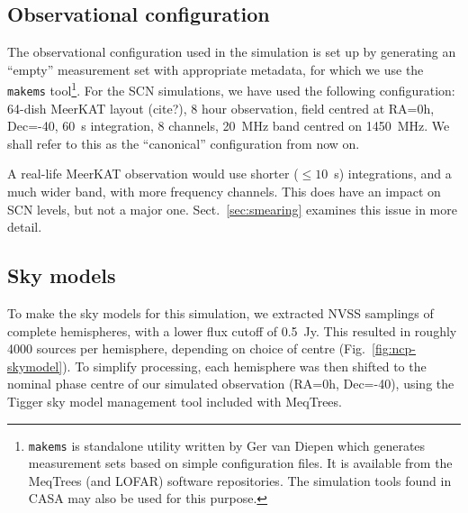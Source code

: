 \documentclass{aa}
\begin{document}
\subsection{Observational configuration}
\label{sec:config}

The observational configuration used in the simulation is set up by generating an ``empty'' measurement set with appropriate metadata, for which we use the {\tt makems} tool\footnote{{\tt makems} is standalone utility written by Ger van Diepen which generates measurement sets based on simple configuration files. It is available from the MeqTrees (and LOFAR) software repositories. The simulation tools found in CASA may also be used for this purpose.}. For the SCN simulations, we have used the following configuration: 64-dish MeerKAT layout (cite?), 8 hour observation, field centred at RA=0h, Dec=-40\degr, 60~s integration, 8 channels, 20~MHz band centred on 1450~MHz. We shall refer to this as the ``canonical'' configuration from now on.

A real-life MeerKAT observation would use shorter ($\leq10$~s) integrations, and a much wider band, with more frequency channels. This does have an impact on SCN levels, but not a major one. Sect.~\ref{sec:smearing} examines this issue in more detail.

\subsection{Sky models}

To make the sky models for this simulation, we extracted NVSS samplings of complete hemispheres, with a lower flux cutoff of 0.5~Jy. This resulted in roughly 4000 sources per hemisphere, depending on choice of centre (Fig.~\ref{fig:ncp-skymodel}). To simplify processing, each hemisphere was then shifted to the nominal phase centre of our simulated observation (RA=0h, Dec=-40\degr), using the Tigger sky model management tool included with MeqTrees.
\end{document}
